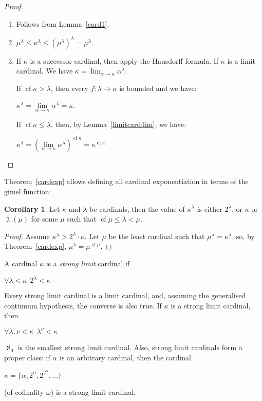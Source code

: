 \documentclass[8pt]{article}
\theoremstyle{definition}
\theoremstyle{definition}
\theoremstyle{definition}
\theoremstyle{definition}
\theoremstyle{definition}
\theoremstyle{definition}
\theoremstyle{definition}
\theoremstyle{definition}
\theoremstyle{definition}
\theoremstyle{definition}
\theoremstyle{definition}
\theoremstyle{definition}
\theoremstyle{definition}
\theoremstyle{definition}
\newtheorem{col}{Corollary}[section]
\theoremstyle{question}
\begin{document}
\begin{proof}
  $ $

  \begin{enumerate}
    \item Follows from Lemma~\ref{card1}.
    \item $\mu^{\lambda} \leq \kappa^{\lambda} \leq (\mu^{\lambda})^{\lambda} = \mu^{\lambda}$.
    \item If $\kappa$ is a successor cardinal, then apply the Hausdorff formula.
    If $\kappa$ is a limit cardinal. We have $\kappa = \lim_{\alpha \to \kappa} \alpha^{\lambda}$.

    If $\operatorname{cf} \kappa > \lambda$, then every $f : \lambda \to \kappa$ is bounded and we have:
    \begin{center}
      $\kappa^{\lambda} = \lim \limits_{\alpha \to \kappa} \alpha^{\lambda} = \kappa$.
    \end{center}

    If $\operatorname{cf} \kappa \leq \lambda$, then, by Lemma~\ref{limitcard:lim}, we have:
    \begin{center}
      $\kappa^{\lambda} = (\lim \limits_{\alpha \to \kappa} \alpha^{\lambda})^{\operatorname{cf} \kappa} = \kappa^{\operatorname{cf} \kappa}$
    \end{center}
  \end{enumerate}
\end{proof}

Theorem~\ref{cardexp} allows defining all cardinal exponentiation in terms of the gimel function:
\begin{col}
  Let $\kappa$ and $\lambda$ be cardinals, then the value of $\kappa^{\lambda}$ 
  is either $2^{\lambda}$, or $\kappa$ or $\gimel(\mu)$ for some $\mu$ such that 
  $\operatorname{cf} \mu \leq \lambda < \mu$.
\end{col}

\begin{proof}
  Assume $\kappa^{\lambda} > 2^{\lambda} \cdot \kappa$. 
  Let $\mu$ be the least cardinal such that $\mu^{\lambda} = \kappa^{\lambda}$, so, by Theorem~\ref{cardexp},
  $\mu^{\lambda} = \mu^{\operatorname{cf} \mu}$.
\end{proof}

A cardinal $\kappa$ is a \emph{strong limit} cardinal if
\begin{center}
  $\forall \lambda < \kappa \:\: 2^{\lambda} < \kappa$
\end{center}

Every strong limit cardinal is a limit cardinal, and, assuming the generalised continuum hypothesis, the converse is also true.
If $\kappa$ is a strong limit cardinal, then
\begin{center}
  $\forall \lambda, \nu < \kappa \:\: \lambda^{\nu} < \kappa$
\end{center}
$\aleph_0$ is the smallest strong limit cardinal. Also, strong limit cardinals form a proper class: 
if $\alpha$ is an arbitrary cardinal, then the cardinal
\begin{center}
  $\kappa = \{ \alpha, 2^{\alpha}, 2^{2^{\alpha}}, \dots \}$
\end{center}
(of cofinality $\omega$) is a strong limit cardinal.
\end{document}
